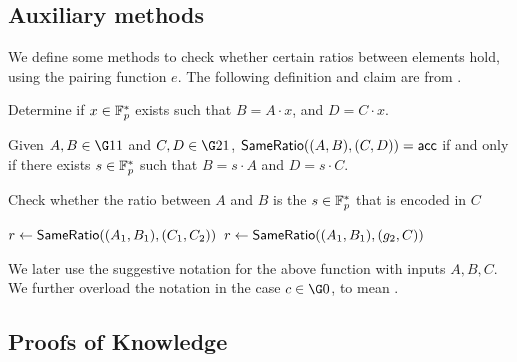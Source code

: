 \documentclass{article}
\begin{document}
\subsection{Auxiliary methods}

We define some methods to check whether certain ratios between elements hold, using the pairing function $e$. The following definition and claim are from \cite{BGG17}.

\begin{algorithm}
\caption{Determine if $x \in {\mathbb F}_p^*$ exists such that $B = A\cdot x$, and $D = C\cdot x$.}
\begin{algorithmic}[1]
      \State
      \Return{\acp}
    \Else
      \State
      \Return{\rej}
    \EndIf
  \EndFunction
\end{algorithmic}
\end{algorithm}

\begin{claim}\label{clm:sameratio}
 Given $A,B\in \G11$ and $C,D\in \G21$,
 $\mathsf{SameRatio}((A,B),(C,D))=\mathsf{acc}$ if and only if
 there exists $s\in {\mathbb F}_p^*$ such that
 $B= s\cdot A$ and $D = s\cdot C$.

\end{claim}

\begin{algorithm}[H]
\caption{Check whether the ratio between $A$ and $B$ is the $s\in {\mathbb F}_p^*$ that is encoded in $C$}
\begin{algorithmic}[1]

      \State $r\gets \mathsf{SameRatio}((A_1,B_1),(C_1,C_2))$ 
    \Else
      \State $r\gets \mathsf{SameRatio}((A_1,B_1),(g_2,C))$
    \EndIf
      \State
    \Else
      \State
    \EndIf
  \EndFunction
\end{algorithmic}
\end{algorithm}
We later use the suggestive notation  for the above function with inputs $A,B,C$.
We further overload the notation  in the case $c\in \G0$, to mean .

\subsection{Proofs of Knowledge}
\end{document}

